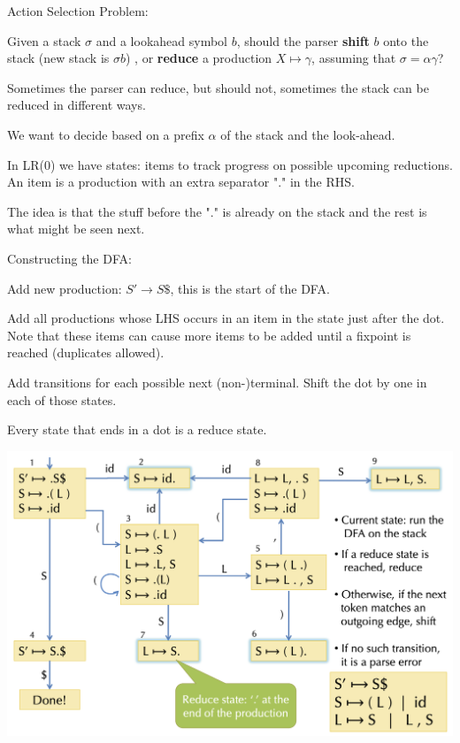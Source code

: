Action Selection Problem:
\begin{compactitem}[$\quad\bullet$]
	\item Given a stack $\sigma$ and a lookahead symbol $b$, should the parser \textbf{shift} $b$ onto the stack (new stack is $\sigma b$) , or \textbf{reduce} a production $X \mapsto \gamma$, assuming that $\sigma = \alpha \gamma$?

	\item Sometimes the parser can reduce, but should not, sometimes the stack can be reduced in different ways.
\end{compactitem}

We want to decide based on a prefix $\alpha$ of the stack and the look-ahead. \medskip

In LR(0) we have states: items to track progress on possible upcoming reductions. An item is a production with an extra separator "." in the RHS. \medskip

The idea is that the stuff before the "." is already on the stack and the rest is what might be seen next. \medskip

Constructing the DFA:
\begin{compactitem}[$\quad\bullet$]
	\item Add new production: $S' \to S\$$, this is the start of the DFA.

	\item Add all productions whose LHS occurs in an item in the state just after the dot. Note that these items can cause more items to be added until a fixpoint is reached (duplicates allowed).

	\item Add transitions for each possible next (non-)terminal. Shift the dot by one in each of those states.

	\item Every state that ends in a dot is a reduce state.
\end{compactitem}
\vspace{-10pt}
\begin{center}
	\includegraphics[width=0.9\linewidth]{assets/dfa.png}
\end{center}
\vspace{-10pt}

